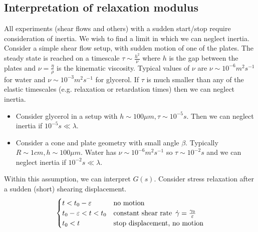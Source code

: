 \documentclass{jknotes}
\begin{document}
\subsection{Interpretation of relaxation modulus}
All experiments (shear flows and others) with a sudden start/stop require
consideration of inertia. We wish to find a limit in which we can neglect
inertia. Consider a simple shear flow setup, with sudden motion of one of the
plates. The steady state is reached on a timescale $\tau \sim \frac{h^2}{\nu}$
where $h$ is the gap between the plates and $\nu = \frac{\eta}{\rho}$ is the
kinematic viscosity. Typical values of $\nu$ are $\nu \sim 10^{-6} m^2 s^{-1}$
for water and $\nu \sim 10^{-3} m^2 s^{-1}$ for glycerol. If $\tau$ is much
smaller than any of the elastic timescales (e.g. relaxation or retardation
times) then we can neglect inertia.

\begin{eg}\hspace{1in}
	\begin{itemize}
		\item Consider glycerol in a setup with $h \sim 100 \mu m, \tau \sim
			10^{-5} s$. Then we can neglect inertia if $10^{-5} s \ll
			\lambda$.
		\item Consider a cone and plate geometry with small angle $\beta$.
			Typically $R \sim 1 cm, h \sim 100 \mu m$. Water has $\nu \sim
			10^{-6} m^2 s^{-1}$ so $\tau \sim 10^{-2} s$ and we can neglect
			inertia if $10^{-2} s \ll \lambda$.
	\end{itemize}
\end{eg}

Within this assumption, we can interpret $G(s)$. Consider stress relaxation
after a sudden (short) shearing displacement. 
\begin{equation}
	\begin{cases}
		t < t_0 - \varepsilon & \text{no motion} \\
		t_0 - \varepsilon < t < t_0 & \text{constant shear rate} \,\,\,
		\dot{\gamma} = \frac{\gamma_0}{\varepsilon} \\
		t_0 < t & \text{stop displacement, no motion}
	\end{cases}
\end{equation}
\end{document}
